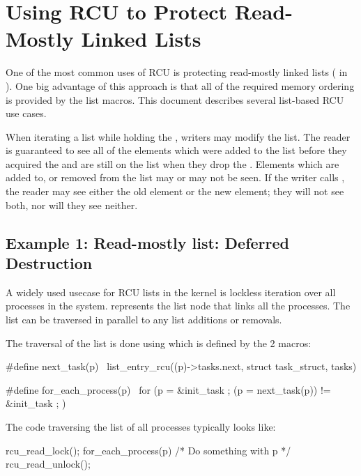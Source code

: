 
\section{Using RCU to Protect Read-Mostly Linked Lists}
\label{sec:rcu:Using RCU to Protect Read-Mostly Linked Lists}

One of the most common uses of RCU is protecting read-mostly linked lists
( in ).
One big advantage of this approach is
that all of the required memory ordering is provided by the list macros.
This document describes several list-based RCU use cases.

When iterating a list while holding the , writers may
modify the list.
The reader is guaranteed to see all of the elements
which were added to the list before they acquired the 
and are still on the list when they drop the .
Elements which are added to, or removed from the list may or may not
be seen.
If the writer calls , the reader may see
either the old element or the new element; they will not see both,
nor will they see neither.


\subsection{Example 1: Read-mostly list: Deferred Destruction}

A widely used usecase for RCU lists in the kernel is lockless iteration over
all processes in the system.
 represents the list node that
links all the processes.
The list can be traversed in parallel to any list
additions or removals.

The traversal of the list is done using  which is defined
by the 2 macros:

\begin{VerbatimU}
	#define next_task(p) \
	        list_entry_rcu((p)->tasks.next, struct task_struct, tasks)

	#define for_each_process(p) \
	        for (p = &init_task ; (p = next_task(p)) != &init_task ; )
\end{VerbatimU}

The code traversing the list of all processes typically looks like:

\begin{VerbatimU}
	rcu_read_lock();
	for_each_process(p) {
		/* Do something with p */
	}
	rcu_read_unlock();
\end{VerbatimU}

